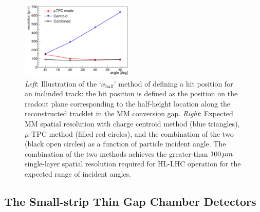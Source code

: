 \begin{figure}[!htb]
    \begin{center}
        \includegraphics[width=0.48\textwidth]{figures/nsw/tpc_vs_centroid_res}
        \caption{
            \textit{Left}: Illustration of the `$x_{\text{half}}$' method of defining a hit position for
                an inclinded track: the hit position is defined as the position on the readout plane
                corresponding to the half-height location along the reconstructed tracklet in the MM conversion gap.
            \textit{Right}: Expected MM spatial resolution with charge centroid method (blue triangles), $\mu$-TPC
                method (filled red circles), and the combination of the two (black open circles) as a function
                of particle incident angle.
                The combination of the two methods achieves the greater-than $100\,\mu m$ single-layer spatial resolution
                required for HL-LHC operation for the expected range of incident angles.
        }
        \label{fig:mm_tpc_hit_loc}
    \end{center}
\end{figure}

\subsection{The Small-strip Thin Gap Chamber Detectors}
\label{sec:nsw_stgc}

